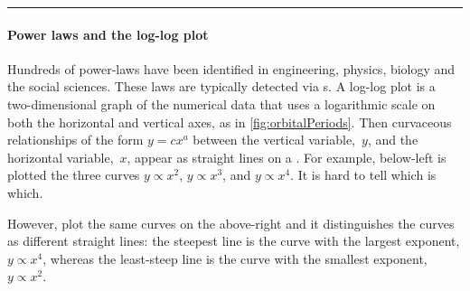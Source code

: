 \begin{table}
\hrule
\begin{minipage}{\linewidth}
\paragraph{Power laws and the log-log plot}
Hundreds of power-laws have been identified in engineering, physics, biology and the social sciences.
These laws are typically detected via s.
A log-log plot is a two-dimensional graph of the numerical data that uses a logarithmic scale on both the horizontal and vertical axes, as in \autoref{fig:orbitalPeriods}.
Then curvaceous relationships of the form $y=cx^a$ between the vertical variable,~$y$, and the horizontal variable,~$x$, appear as straight lines on a .
For example, below-left is plotted the three curves $y\propto x^2$,  $y\propto x^3$, and  $y\propto x^4$.
It is hard to tell which is which.
\begin{center} 
 \hfil
{} 
\end{center}
However, plot the same curves on the above-right  and it  distinguishes the curves as different straight lines: the steepest line is the curve with the largest exponent, $y\propto x^4$, whereas the least-steep line is the curve with the smallest exponent, $y\propto x^2$.


\end{minipage}
\end{table}
